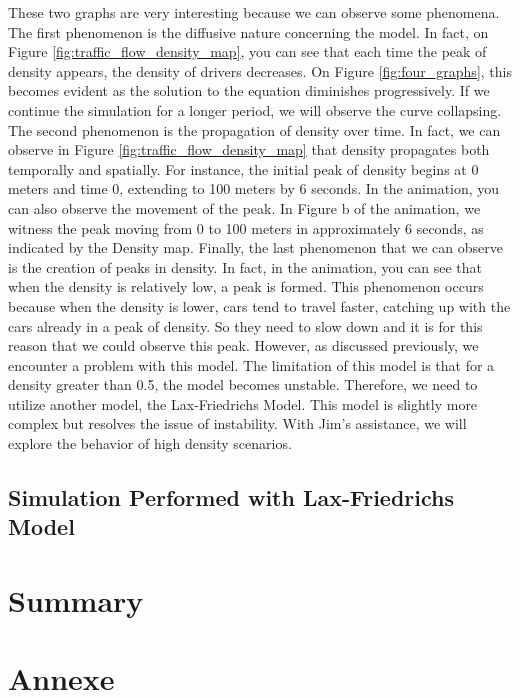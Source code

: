\documentclass{article}
\begin{document}
	These two graphs are very interesting because we can observe some phenomena. The first phenomenon is the diffusive nature concerning the model. In fact, on Figure \ref{fig:traffic_flow_density_map}, you can see that each time the peak of density appears, the density of drivers decreases. On Figure \ref{fig:four_graphs}, this becomes evident as the solution to the equation diminishes progressively. If we continue the simulation for a longer period, we will observe the curve collapsing.
	\newline\newline
	The second phenomenon is the propagation of density over time. In fact, we can observe in Figure \ref{fig:traffic_flow_density_map} that density propagates both temporally and spatially. For instance, the initial peak of density begins at 0 meters and time 0, extending to 100 meters by 6 seconds. In the animation, you can also observe the movement of the peak. In Figure b of the animation, we witness the peak moving from 0 to 100 meters in approximately 6 seconds, as indicated by the Density map.
	\newline\newline
	Finally, the last phenomenon that we can observe is the creation of peaks in density. In fact, in the animation, you can see that when the density is relatively low, a peak is formed. This phenomenon occurs because when the density is lower, cars tend to travel faster, catching up with the cars already in a peak of density. So they need to slow down and it is for this reason that we could observe this peak.
	\newline\newline
	However, as discussed previously, we encounter a problem with this model. The limitation of this model is that for a density greater than 0.5, the model becomes unstable. Therefore, we need to utilize another model, the Lax-Friedrichs Model. This model is slightly more complex but resolves the issue of instability. With Jim's assistance, we will explore the behavior of high density scenarios.
	\subsection{Simulation Performed with Lax-Friedrichs Model}
	
	
	\section{Summary}
	
	\section{Annexe}
	
\end{document}
